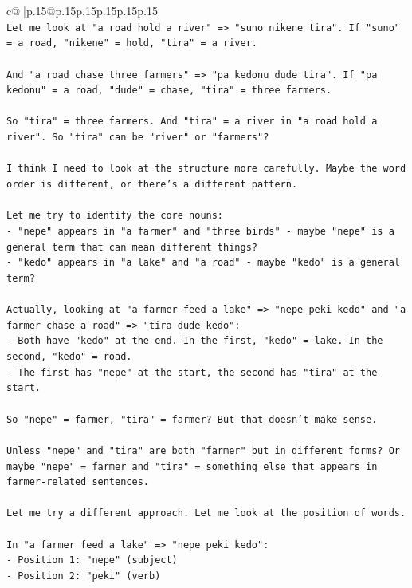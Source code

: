 \documentclass{article}
\begin{document}
{\begin{supertabular}{c@{$\;$}|p{.15\linewidth}@{}p{.15\linewidth}p{.15\linewidth}p{.15\linewidth}p{.15\linewidth}p{.15\linewidth}}
{{{\\ 
\texttt{Let me look at "a road hold a river" => "suno nikene tira". If "suno" = a road, "nikene" = hold, "tira" = a river.} \\
\\ 
\texttt{And "a road chase three farmers" => "pa kedonu dude tira". If "pa kedonu" = a road, "dude" = chase, "tira" = three farmers.} \\
\\ 
\texttt{So "tira" = three farmers. And "tira" = a river in "a road hold a river". So "tira" can be "river" or "farmers"?} \\
\\ 
\texttt{I think I need to look at the structure more carefully. Maybe the word order is different, or there's a different pattern.} \\
\\ 
\texttt{Let me try to identify the core nouns:} \\
\texttt{{-} "nepe" appears in "a farmer" and "three birds" {-} maybe "nepe" is a general term that can mean different things?} \\
\texttt{{-} "kedo" appears in "a lake" and "a road" {-} maybe "kedo" is a general term?} \\
\\ 
\texttt{Actually, looking at "a farmer feed a lake" => "nepe peki kedo" and "a farmer chase a road" => "tira dude kedo":} \\
\texttt{{-} Both have "kedo" at the end. In the first, "kedo" = lake. In the second, "kedo" = road.} \\
\texttt{{-} The first has "nepe" at the start, the second has "tira" at the start.} \\
\\ 
\texttt{So "nepe" = farmer, "tira" = farmer? But that doesn't make sense.} \\
\\ 
\texttt{Unless "nepe" and "tira" are both "farmer" but in different forms? Or maybe "nepe" = farmer and "tira" = something else that appears in farmer{-}related sentences.} \\
\\ 
\texttt{Let me try a different approach. Let me look at the position of words.} \\
\\ 
\texttt{In "a farmer feed a lake" => "nepe peki kedo":} \\
\texttt{{-} Position 1: "nepe" (subject)} \\
\texttt{{-} Position 2: "peki" (verb)} \\
}}}
\end{supertabular}}
\end{document}
